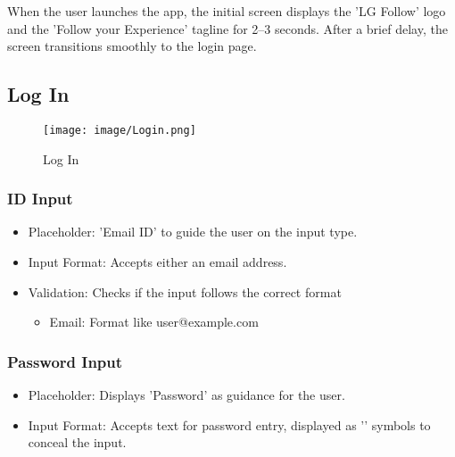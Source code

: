 \documentclass[conference]{IEEEtran}
\begin{document}
\noindent When the user launches the app, the initial screen displays the 'LG Follow' logo and the 'Follow your Experience' tagline for 2–3 seconds. After a brief delay, the screen transitions smoothly to the login page.\\

\clearpage

\subsection{Log In}

\begin{figure}[h!]
    \centering
    \texttt{[image: image/Login.png]}
    \caption{Log In}
    \label{fig:enter-label}
\end{figure}

\subsubsection{ID Input}
\begin{itemize}
    \item Placeholder: 'Email ID' to guide the user on the input type.\\
    \item Input Format: Accepts either an email address.\\
    \item Validation: Checks if the input follows the correct format
\begin{itemize}
    \item Email: Format like user@example.com\\
\end{itemize}
\end{itemize}

\subsubsection{Password Input}
\begin{itemize}
    \item Placeholder: Displays 'Password' as guidance for the user.\\
    \item Input Format: Accepts text for password entry, displayed as '\textbullet' symbols to conceal the input.\\
\end{itemize}
\end{document}
